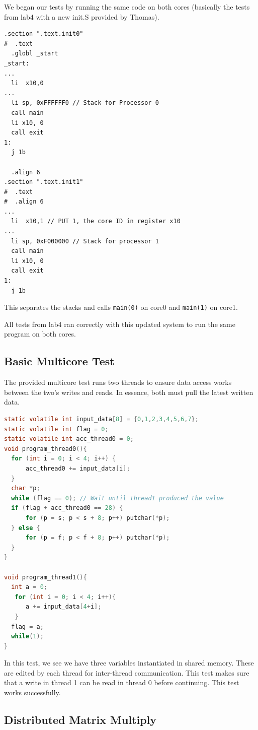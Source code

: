 \documentclass{article}
\begin{document}
We began our tests by running the same code on both cores (basically the tests from lab4 with a new init.S provided by Thomas).

\begin{lstlisting}[language=RSVAssembler]
.section ".text.init0"
#  .text
  .globl _start
_start:
...
  li  x10,0
...
  li sp, 0xFFFFFF0 // Stack for Processor 0
  call main
  li x10, 0
  call exit
1:
  j 1b

  .align 6
.section ".text.init1"
#  .text
#  .align 6
...
  li  x10,1 // PUT 1, the core ID in register x10
...
  li sp, 0xF000000 // Stack for processor 1
  call main
  li x10, 0
  call exit
1:
  j 1b
\end{lstlisting}

This separates the stacks and calls \lstinline|main(0)| on core0 and \lstinline|main(1)| on core1.

All tests from lab4 ran correctly with this updated system to run the same program on both cores.

\subsection{Basic Multicore Test}

The provided multicore test runs two threads to ensure data access works between the two's writes and reads. In essence, both must pull the latest written data.

\begin{lstlisting}[language=C]
static volatile int input_data[8] = {0,1,2,3,4,5,6,7};
static volatile int flag = 0;
static volatile int acc_thread0 = 0;
void program_thread0(){
  for (int i = 0; i < 4; i++) {
      acc_thread0 += input_data[i];
  }
  char *p;
  while (flag == 0); // Wait until thread1 produced the value
  if (flag + acc_thread0 == 28) {
      for (p = s; p < s + 8; p++) putchar(*p);
  } else {
      for (p = f; p < f + 8; p++) putchar(*p);
  }
}

void program_thread1(){
  int a = 0;
   for (int i = 0; i < 4; i++){
      a += input_data[4+i];
   }
  flag = a;
  while(1);
}
\end{lstlisting}
In this test, we see we have three variables instantiated in shared memory. These are edited by each thread for inter-thread communication. This test makes sure that a write in thread 1 can be read in thread 0 before continuing. This test works successfully.

\subsection{Distributed Matrix Multiply}
\end{document}
